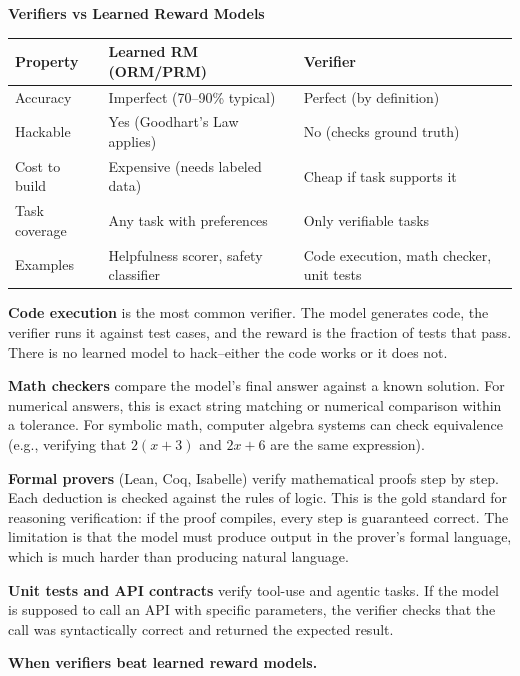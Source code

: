 \begin{chapterenv}
\begin{infobox}
\textbf{Verifiers vs Learned Reward Models}

\begin{tabular}{p{}p{}p{}}
\toprule
\textbf{Property} & \textbf{Learned RM (ORM/PRM)} & \textbf{Verifier} \\
\midrule
Accuracy & Imperfect (70--90\% typical) & Perfect (by definition) \\
Hackable & Yes (Goodhart's Law applies) & No (checks ground truth) \\
Cost to build & Expensive (needs labeled data) & Cheap if task supports it \\
Task coverage & Any task with preferences & Only verifiable tasks \\
Examples & Helpfulness scorer, safety classifier & Code execution, math checker, unit tests \\
\bottomrule
\end{tabular}
\end{infobox}

\textbf{Code execution} is the most common verifier. The model generates code, the verifier runs it against test cases, and the reward is the fraction of tests that pass. There is no learned model to hack--either the code works or it does not.

\textbf{Math checkers} compare the model's final answer against a known solution. For numerical answers, this is exact string matching or numerical comparison within a tolerance. For symbolic math, computer algebra systems can check equivalence (e.g., verifying that $2(x+3)$ and $2x+6$ are the same expression).

\textbf{Formal provers} (Lean, Coq, Isabelle) verify mathematical proofs step by step. Each deduction is checked against the rules of logic. This is the gold standard for reasoning verification: if the proof compiles, every step is guaranteed correct. The limitation is that the model must produce output in the prover's formal language, which is much harder than producing natural language.

\textbf{Unit tests and API contracts} verify tool-use and agentic tasks. If the model is supposed to call an API with specific parameters, the verifier checks that the call was syntactically correct and returned the expected result.

\begin{tipbox}
\textbf{When verifiers beat learned reward models.}


\end{tipbox}
\end{chapterenv}
